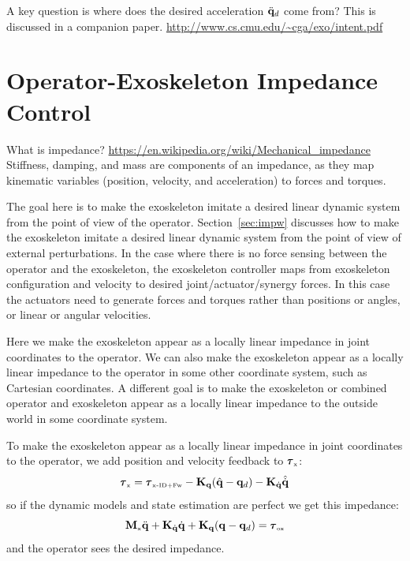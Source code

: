 \documentclass[letterpaper,12pt,fullpage]{article}
\newcommand{\myx}{{\mbox {\tiny x}}}
\newcommand{\ox}{{\mbox {\tiny ox}}}
\newcommand{\xinvdynw}{{\mbox {\tiny x-ID+Fw}}}
\begin{document}
A key question is where does the desired acceleration $\ddot{{\bf q}}_d$ come from?
This is discussed in a companion paper.
\url{http://www.cs.cmu.edu/~cga/exo/intent.pdf}

\section{Operator-Exoskeleton Impedance Control}

What is impedance?
\url{https://en.wikipedia.org/wiki/Mechanical_impedance}
Stiffness, damping, and mass are components of an impedance, as
they map kinematic variables (position, velocity, and acceleration)
to forces and torques.

The goal here is to make the exoskeleton imitate a desired linear dynamic system
from the point of view of the operator.
Section~\ref{sec:impw} discusses how to make the exoskeleton 
imitate a desired linear dynamic system 
from the point of view of external perturbations.
In the case where there is no force sensing between the operator and the
exoskeleton, the exoskeleton controller maps from exoskeleton configuration
and velocity to desired joint/actuator/synergy forces.
In this case the actuators need to generate forces and torques rather than
positions or angles, or linear or angular velocities.

Here we make the exoskeleton appear as a locally linear impedance in joint
coordinates to the operator.
We can also make the exoskeleton appear as a locally linear impedance to the
operator in some other coordinate system, such as Cartesian coordinates.
A different goal is to make the exoskeleton or combined operator and
exoskeleton appear as a locally linear impedance to
the outside world in some coordinate system.

To make the exoskeleton appear as a locally linear impedance in joint
coordinates to the operator, we add position and velocity feedback to $\vtau_{\myx}$:
\begin{equation}
\vtau_{\myx} = \vtau_{\xinvdynw} - \mK_{\vq} ( \hat{\vq} - \vq_d ) - \mK_{\dot{\vq}} \hat{\dot{\vq}}
\label{eq:impedance}
\end{equation}
so if the dynamic models and state estimation are perfect we get this impedance:
\begin{equation}
\mM_{\myx} \ddot{\vq} + \mK_{\dot{\vq}} \dot{\vq} + \mK_{\vq} ( \vq - \vq_d ) = \vtau_{\ox}
\end{equation}
and the operator sees the desired impedance.
\end{document}

